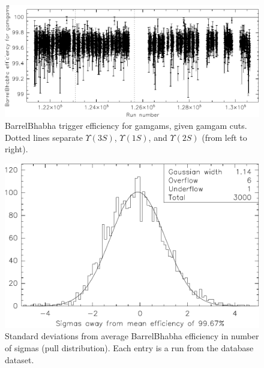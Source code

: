 \begin{figure}[p]
  \begin{center}
    \includegraphics[width=\linewidth]{plots/trigger_gamgam_vrun}
  \end{center}
  \caption{\label{trigger_gamgam_vrun} BarrelBhabha trigger efficiency
  for gamgams, given gamgam cuts.  Dotted lines separate
  $\Upsilon(3S)$, $\Upsilon(1S)$, and $\Upsilon(2S)$ (from left to
  right).}
\end{figure}

\begin{figure}[p]
  \begin{center}
    \includegraphics[width=\linewidth]{plots/trigger_gamgam_hist}
  \end{center}
  \caption{\label{trigger_gamgam_hist} Standard deviations from
    average BarrelBhabha efficiency in number of sigmas (pull
    distribution).  Each entry is a run from the database dataset.}
\end{figure}
